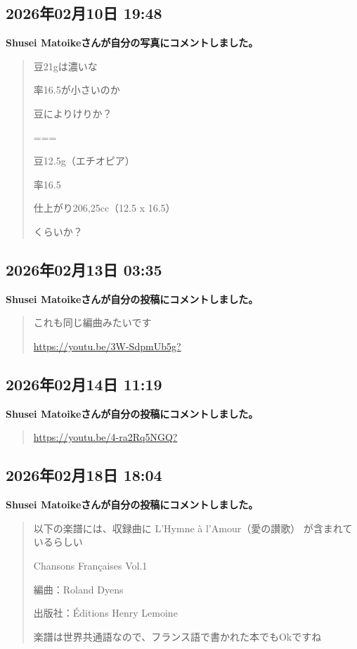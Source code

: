 \subsection*{2026年02月10日 19:48}

\textbf{Shusei Matoikeさんが自分の写真にコメントしました。}

\begin{quote}
豆21gは濃いな

率16.5が小さいのか

豆によりけりか？

===

豆12.5g（エチオピア）

率16.5

仕上がり206,25cc（12.5 x 16.5）

くらいか？
\end{quote}

\subsection*{2026年02月13日 03:35}

\textbf{Shusei Matoikeさんが自分の投稿にコメントしました。}

\begin{quote}
これも同じ編曲みたいです

\url{https://youtu.be/3W-SdpmUb5g?}
\end{quote}

\subsection*{2026年02月14日 11:19}

\textbf{Shusei Matoikeさんが自分の投稿にコメントしました。}

\begin{quote}
\url{https://youtu.be/4-ra2Rq5NGQ?}
\end{quote}

\subsection*{2026年02月18日 18:04}

\textbf{Shusei Matoikeさんが自分の投稿にコメントしました。}

\begin{quote}
以下の楽譜には、収録曲に L’Hymne à l’Amour（愛の讃歌） が含まれているらしい

Chansons Françaises Vol.1

編曲：Roland Dyens

出版社：Éditions Henry Lemoine

楽譜は世界共通語なので、フランス語で書かれた本でもOkですね
\end{quote}

